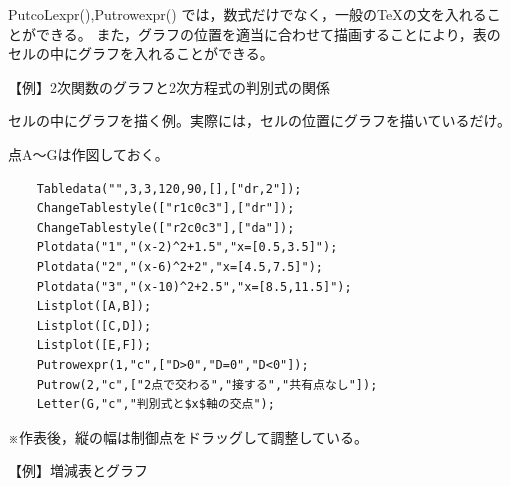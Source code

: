 \documentclass[papersize,a4paper,12pt,uplatex]{jsarticle}
\begin{document}
\begin{description}
\begin{description}
  PutcoLexpr(),Putrowexpr() では，数式だけでなく，一般の\TeX の文を入れることができる。
  また，グラフの位置を適当に合わせて描画することにより，表のセルの中にグラフを入れることができる。

\vspace{\baselineskip}
  【例】2次関数のグラフと2次方程式の判別式の関係
  
セルの中にグラフを描く例。実際には，セルの位置にグラフを描いているだけ。

点A〜Gは作図しておく。
    
\begin{verbatim}
    Tabledata("",3,3,120,90,[],["dr,2"]);
    ChangeTablestyle(["r1c0c3"],["dr"]);
    ChangeTablestyle(["r2c0c3"],["da"]);
    Plotdata("1","(x-2)^2+1.5","x=[0.5,3.5]");
    Plotdata("2","(x-6)^2+2","x=[4.5,7.5]");
    Plotdata("3","(x-10)^2+2.5","x=[8.5,11.5]");
    Listplot([A,B]);
    Listplot([C,D]);
    Listplot([E,F]);
    Putrowexpr(1,"c",["D>0","D=0","D<0"]);
    Putrow(2,"c",["2点で交わる","接する","共有点なし"]);
    Letter(G,"c","判別式と$x$軸の交点");
\end{verbatim}

\vspace{\baselineskip}
 \begin{center}  \end{center}

    ※作表後，縦の幅は制御点をドラッグして調整している。

\vspace{\baselineskip}
【例】増減表とグラフ


\end{description}
\end{description}
\end{document}
